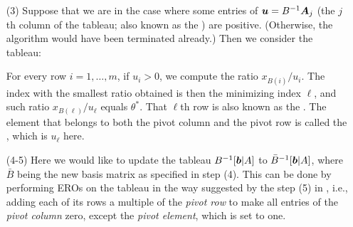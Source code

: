 \begin{enumerate}
\begin{itemize}
\item[(3)] Suppose that we are in the case where some entries of
\(\bm{u}=B^{-1}\bm{A}_j\) (the \(j\)th column of the tableau; also known as
the ) are positive.  (Otherwise, the algorithm would have
been terminated already.) Then we consider the tableau:
\begin{center}
\end{center}
For every row \(i=1,\dotsc,m\), if \(u_i>0\), we compute the ratio
\(x_{B(i)}/u_{i}\). The index with the smallest ratio obtained is then the
minimizing index \(\ell\), and such ratio \(x_{B(\ell)}/u_{\ell}\) equals
\(\theta^*\). That \(\ell\)th row is also known as the .  The
element that belongs to both the pivot column and the pivot row is called the
, which is \(u_{\ell}\) here.
\item[(4-5)] Here we would like to update the tableau \(B^{-1}[\bm{b}|A]\) to
\(\bar{B}^{-1}[\bm{b}|A]\), where \(\bar{B}\) being the new basis matrix as
specified in step (4). This can be done by performing EROs on the tableau in
the way suggested by the step (5) in , i.e.,
adding each of its rows a multiple of the \emph{pivot row} to make all entries of the
\emph{pivot column} zero, except the \emph{pivot element}, which is set to one.


\end{itemize}
\end{enumerate}
